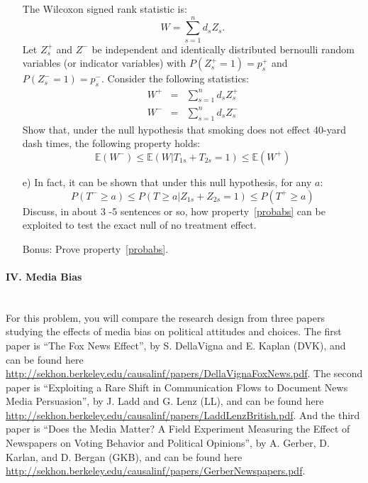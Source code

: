 \documentclass{article}
\newcommand{\E}[0]{\mathbb{E}}
\begin{document}
\begin{itemize}
          The Wilcoxon signed rank statistic is:
          $$
            W = \sum_{s=1}^n d_sZ_s.
          $$
          Let $Z^+_s$ and $Z^-$ be independent and identically distributed 
          bernoulli random variables (or indicator variables) with $P(Z^+_s = 1) = p^+_s$
          and $P(Z^-_s = 1) = p^-_s$.
          Consider the following statistics:
          \begin{eqnarray*}
            W^+ &=& \sum_{s=1}^n d_s Z^+_s \\
            W^- & = & \sum_{s=1}^n d_sZ^-_s
          \end{eqnarray*}
          Show that, under the null hypothesis that smoking does not effect 40-yard dash times, 
          the following property holds:
          $$
           \E(W^-)\leq  \E(W| T_{1s} + T_{2s} =1) \leq \E(W^+) 
          $$
        \item[e)]
          In fact, it can be shown that under this null hypothesis, for any $a$:
          \begin{equation}
            P(T^- \geq a) \leq P(T \geq a | Z_{1s} + Z_{2s} = 1) \leq P(T^+ \geq a)
            \label{probabs}
          \end{equation}
          Discuss, in about 3 -5 sentences or so, how property~\eqref{probabs} can be
          exploited to test the exact null of no treatment effect. 
        \item[Bonus:]
          Prove property~\eqref{probabs}. 
      \end{itemize}

\paragraph{\Large IV. Media Bias \\ \\}

For this problem, you will compare the research design from three
papers studying the effects of media bias on political attitudes and
choices.  The first paper is ``The Fox News Effect'', by S.
DellaVigna and E. Kaplan (DVK), and can be found here
\url{http://sekhon.berkeley.edu/causalinf/papers/DellaVignaFoxNews.pdf}. The
second paper is ``Exploiting a Rare Shift in Communication Flows to
Document News Media Persuasion'', by J. Ladd and G. Lenz (LL),
and can be found here
\url{http://sekhon.berkeley.edu/causalinf/papers/LaddLenzBritish.pdf}. And
the third paper is ``Does the Media Matter? A Field Experiment
Measuring the Effect of Newspapers on Voting Behavior and Political
Opinions'', by A. Gerber, D. Karlan, and D. Bergan (GKB), and
can be found here
\url{http://sekhon.berkeley.edu/causalinf/papers/GerberNewspapers.pdf}.
\end{document}

